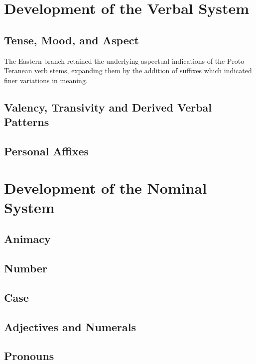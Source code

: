 \documentclass[grammar]{subfiles}
\begin{document}
\section{Development of the Verbal System}
\label{sec:history:verbal_development}

\Tbw

\subsection{Tense, Mood, and Aspect}
\label{ssec:history:pt:vd:tense_mood_aspect}

The Eastern branch retained the underlying aspectual indications of the
Proto-Teranean verb stems, expanding them by the addition of suffixes which
indicated finer variations in meaning.

\Tbw

\subsection{Valency, Transivity and Derived Verbal Patterns}
\label{ssec:history:pt:vd:valency_verbal_patterns}

\Tbw

\subsection{Personal Affixes}
\label{ssec:history:pt:vd:personal_affixes}

\Tbw

\section{Development of the Nominal System}
\label{sec:history:pt:nominal_development}

\Tbw

\subsection{Animacy}
\label{ssec:history:pt:nd:animacy}

\Tbw

\subsection{Number}
\label{ssec:history:pt:nd:number}

\Tbw

\subsection{Case}
\label{ssec:history:pt:nd:case}

\Tbw

\subsection{Adjectives and Numerals}
\label{ssec:history:pt:nd:adjectives_numerals}

\Tbw

\subsection{Pronouns}
\label{ssec:history:pt:nd:pronouns}

\Tbw
\end{document}
